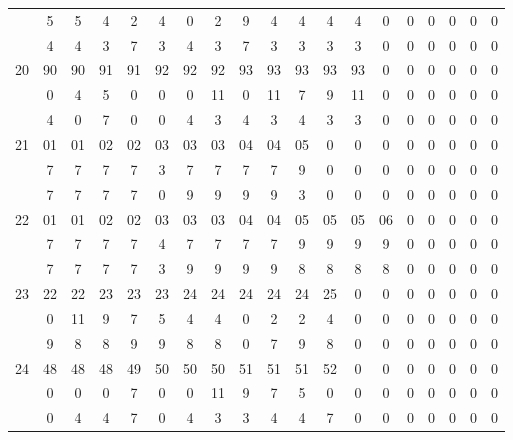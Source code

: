 \documentclass[letterpaper,12pt]{book}
\theoremstyle{definition} \newtheorem{Def}{Definición}[chapter]
\theoremstyle{definition} \newtheorem{Teo}{Teorema}[chapter]
\theoremstyle{definition} \newtheorem{Pro}{Proposición}[chapter]
\theoremstyle{definition} \newtheorem{Lema}{Lema}[chapter]
\begin{document}
\begin{table}
{\begin{tabular}{c c c c c c c c c c c c c c c c c c c}
 & 5 & 5 & 4 & 2 & 4 & 0 & 2 & 9 & 4 & 4 & 4 & 4 & 0 & 0 & 0 & 0 & 0 & 0 \\ %
 & 4 & 4 & 3 & 7 & 3 & 4 & 3 & 7 & 3 & 3 & 3 & 3 & 0 & 0 & 0 & 0 & 0 & 0 \\ %
20 & 90 & 90 & 91 & 91 & 92 & 92 & 92 & 93 & 93 & 93 & 93 & 93 & 0 & 0 & 0 & 0 & 0 & 0 \\ %
 & 0 & 4 & 5 & 0 & 0 & 0 & 11 & 0 & 11 & 7 & 9 & 11 & 0 & 0 & 0 & 0 & 0 & 0 \\ %
 & 4 & 0 & 7 & 0 & 0 & 4 & 3 & 4 & 3 & 4 & 3 & 3 & 0 & 0 & 0 & 0 & 0 & 0 \\%
21 & 01 & 01 & 02 & 02 & 03 & 03 & 03 & 04 & 04 & 05 & 0 & 0 & 0 & 0 & 0 & 0 & 0 & 0 \\ %
 & 7 &  7 &  7 &  7  & 3 &  7 &  7 &  7 &  7 &  9 &  0  & 0 & 0 & 0 & 0 & 0 & 0 & 0 \\ %
 & 7 &  7 &  7 &  7 &  0 &  9 &  9 &  9  & 9 &  3  & 0 & 0 & 0 & 0 & 0 & 0 & 0 & 0 \\ %
22 & 01 & 01 & 02 & 02 & 03 & 03 & 03 & 04 & 04 & 05 & 05 & 05 & 06 & 0 & 0 & 0 & 0 & 0 \\ %
 & 7 & 7 & 7 & 7 & 4 & 7 & 7 & 7 & 7 & 9 & 9 & 9 & 9 & 0 & 0 & 0 & 0 & 0 \\%
 & 7 & 7 & 7 & 7 & 3 & 9 & 9 & 9 & 9 & 8 &  8 &  8 &  8 &  0 &  0 & 0 &  0 & 0 \\ %
23 & 22 & 22 & 23 & 23 & 23 & 24 & 24 & 24 & 24 & 24 & 25 & 0 & 0 & 0 & 0 & 0 & 0 & 0 \\ %
 & 0 & 11 & 9 &  7 &  5 &  4 &  4 &  0 &  2 & 2 & 4 & 0 & 0 & 0 & 0 & 0 & 0 & 0 \\ %
 & 9 &  8 &  8 &  9 &  9 &  8 &  8 &  0 &  7 & 9 & 8 & 0 & 0 & 0 & 0 & 0 & 0 & 0 \\ %
24 & 48 & 48 & 48 & 49 & 50 & 50 & 50 & 51 & 51 & 51 & 52 & 0 & 0 & 0 & 0 & 0 & 0 & 0 \\ %
 & 0 &  0 &  0 &  7 &  0 &  0 & 11 & 9 &  7 &  5 &  0 &  0 &  0 & 0 &  0 &  0 &  0 &  0 \\ %
 & 0 &  4 &  4  & 7 &  0 &  4 & 3 &  3 &  4 &  4 &  7  & 0 &  0 &  0 &  0 &  0 &  0 &  0 \\ %


\end{tabular}}
\end{table}
\end{document}
